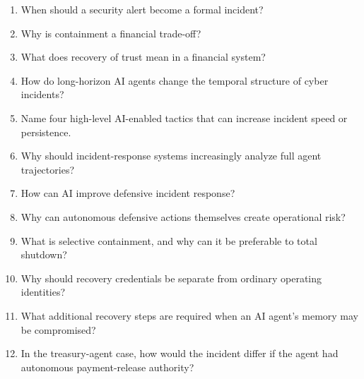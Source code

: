 \begin{enumerate}
    \item When should a security alert become a formal incident?
    \item Why is containment a financial trade-off?
    \item What does recovery of trust mean in a financial system?
    \item How do long-horizon AI agents change the temporal structure of cyber incidents?
    \item Name four high-level AI-enabled tactics that can increase incident speed or persistence.
    \item Why should incident-response systems increasingly analyze full agent trajectories?
    \item How can AI improve defensive incident response?
    \item Why can autonomous defensive actions themselves create operational risk?
    \item What is selective containment, and why can it be preferable to total shutdown?
    \item Why should recovery credentials be separate from ordinary operating identities?
    \item What additional recovery steps are required when an AI agent's memory may be compromised?
    \item In the treasury-agent case, how would the incident differ if the agent had autonomous payment-release authority?
\end{enumerate}
